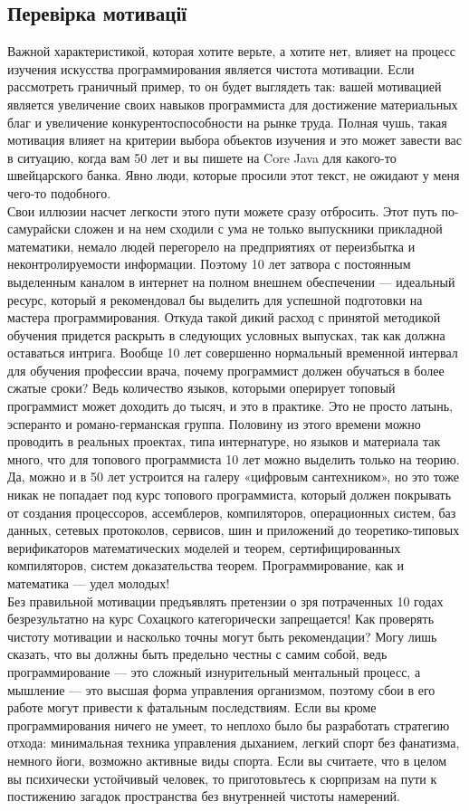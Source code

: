 \subsection{Перевірка мотивації}

Важной характеристикой, которая хотите верьте, а хотите нет, влияет на процесс изучения искусства программирования является чистота мотивации. Если рассмотреть граничный пример, то он будет выглядеть так: вашей мотивацией является увеличение своих навыков программиста для достижение материальных благ и увеличение конкурентоспособности на рынке труда. Полная чушь, такая мотивация влияет на критерии выбора объектов изучения и это может завести вас в ситуацию, когда вам 50 лет и вы пишете на Core Java для какого-то швейцарского банка. Явно люди, которые просили этот текст, не ожидают у меня чего-то подобного.
\\
Свои иллюзии насчет легкости этого пути можете сразу отбросить. Этот путь по-самурайски сложен и на нем сходили с ума не только выпускники прикладной математики, немало людей перегорело на предприятиях от переизбытка и неконтролируемости информации. Поэтому 10 лет затвора с постоянным выделенным каналом в интернет на полном внешнем обеспечении — идеальный ресурс, который я рекомендовал бы выделить для успешной подготовки на мастера программирования. Откуда такой дикий расход с принятой методикой обучения придется раскрыть в следующих условных выпусках, так как должна оставаться интрига. Вообще 10 лет совершенно нормальный временной интервал для обучения профессии врача, почему программист должен обучаться в более сжатые сроки? Ведь количество языков, которыми оперирует топовый программист может доходить до тысяч, и это в практике. Это не просто латынь, эсперанто и романо-германская группа. Половину из этого времени можно проводить в реальных проектах, типа интернатуре, но языков и материала так много, что для топового программиста 10 лет можно выделить только на теорию.
\\
Да, можно и в 50 лет устроится на галеру «цифровым сантехником», но это тоже никак не попадает под курс топового программиста, который должен покрывать от создания процессоров, ассемблеров, компиляторов, операционных систем, баз данных, сетевых протоколов, сервисов, шин и приложений до теоретико-типовых верификаторов математических моделей и теорем, сертифицированных компиляторов, систем доказательства теорем. Программирование, как и математика — удел молодых!
\\
Без правильной мотивации предъявлять претензии о зря потраченных 10 годах безрезультатно на курс Сохацкого категорически запрещается! Как проверять чистоту мотивации и насколько точны могут быть рекомендации? Могу лишь сказать, что вы должны быть предельно честны с самим собой, ведь программирование — это сложный изнурительный ментальный процесс, а мышление — это высшая форма управления организмом, поэтому сбои в его работе могут привести к фатальным последствиям. Если вы кроме программирования ничего не умеет, то неплохо было бы разработать стратегию отхода: минимальная техника управления дыханием, легкий спорт без фанатизма, немного йоги, возможно активные виды спорта. Если вы считаете, что в целом вы психически устойчивый человек, то приготовьтесь к сюрпризам на пути к постижению загадок пространства без внутренней чистоты намерений.
